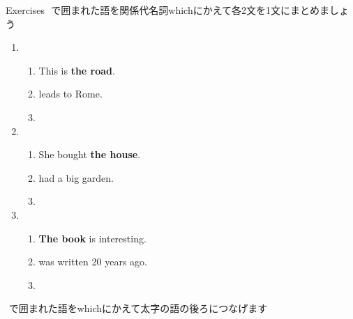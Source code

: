 \documentclass[aspectratio=169,xcolor={dvipsnames,table}]{beamer}
\begin{document}
\begin{frame}[plain]{Exercises}
\fbox{　　}\,\,で囲まれた語を関係代名詞whichにかえて各2文を1文にまとめましょう%

\begin{enumerate}
 \item \begin{enumerate}
	\item This is {\bfseries the road}.
	\item {} leads to Rome.
	\item {}
       \end{enumerate}
 \item \begin{enumerate}
	\item She bought {\bfseries the house}.
	\item {} had a big garden.
	\item {}
       \end{enumerate}
 \item \begin{enumerate}
	\item {\bfseries The book} is interesting.
	\item {} was written 20 years ago.
	\item {}
       \end{enumerate}
\end{enumerate} 

\fbox{　　}\,\,で囲まれた語をwhichにかえて太字の語の後ろにつなげます%
\mbox{}\hfill{\scriptsize {}}
\end{frame}
\end{document}
